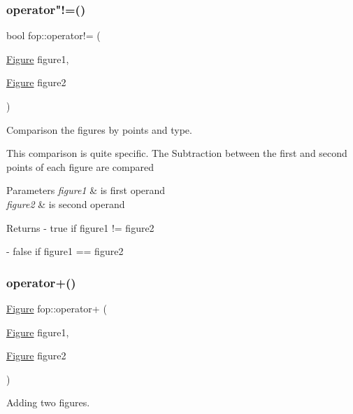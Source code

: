 \subsubsection{\texorpdfstring{operator"!=()}{operator!=()}}
{\footnotesize\ttfamily bool fop\+::operator!= (\begin{DoxyParamCaption}\item[{\mbox{\hyperlink{classfop_1_1_figure}{Figure}}}]{figure1,  }\item[{\mbox{\hyperlink{classfop_1_1_figure}{Figure}}}]{figure2 }\end{DoxyParamCaption})}



Comparison the figures by points and type. 

This comparison is quite specific. The Subtraction between the first and second points of each figure are compared 
\begin{DoxyParams}{Parameters}
{\em figure1} & is first operand \\
\hline
{\em figure2} & is second operand \\
\hline
\end{DoxyParams}
\begin{DoxyReturn}{Returns}
-\/ true if \textquotesingle{}figure1\textquotesingle{} != \textquotesingle{}figure2\textquotesingle{} 

-\/ false if \textquotesingle{}figure1\textquotesingle{} == \textquotesingle{}figure2\textquotesingle{} 
\end{DoxyReturn}
\mbox{\label{namespacefop_a0cdacf03236287528189a51913750a8c}} 
\subsubsection{\texorpdfstring{operator+()}{operator+()}}
{\footnotesize\ttfamily \mbox{\hyperlink{classfop_1_1_figure}{Figure}} fop\+::operator+ (\begin{DoxyParamCaption}\item[{\mbox{\hyperlink{classfop_1_1_figure}{Figure}}}]{figure1,  }\item[{\mbox{\hyperlink{classfop_1_1_figure}{Figure}}}]{figure2 }\end{DoxyParamCaption})}



Adding two figures. 

